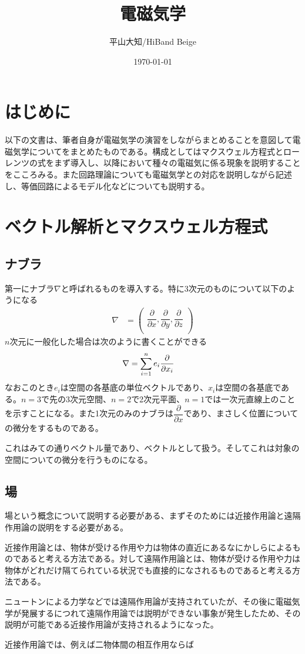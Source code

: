 \documentclass[titlepage,fontsize=10.5 pt]{jlreq}
\begin{document}
\title{電磁気学}
\author{平山大知/HiBand Beige}
\date{\today}
\maketitle
\tableofcontents
\clearpage
\section{はじめに}
以下の文書は、筆者自身が電磁気学の演習をしながらまとめることを意図して電磁気学についてをまとめたものである。構成としてはマクスウェル方程式とローレンツの式をまず導入し、以降において種々の電磁気に係る現象を説明することをこころみる。また回路理論についても電磁気学との対応を説明しながら記述し、等価回路によるモデル化などについても説明する。
\section{ベクトル解析とマクスウェル方程式}
\subsection{ナブラ}
第一にナブラ$\nabla$と呼ばれるものを導入する。特に3次元のものについて以下のようになる
\begin{align}
    \nabla &= \begin{pmatrix}
        \dfrac{\partial}{\partial x} , \dfrac{\partial}{\partial y} , \dfrac{\partial }{\partial z} \\
    \end{pmatrix}\label{eq.nabla}
\end{align}
$n$次元に一般化した場合は次のように書くことができる
\begin{align}
    \nabla &= \sum_{i=1}^{n} e_{i} \pdv{}{x_{i}}
\end{align}
なおこのとき$e_{i}$は空間の各基底の単位ベクトルであり、$x_{i}$は空間の各基底である。$n=3$で先の3次元空間、$n=2$で2次元平面、$n=1$では一次元直線上のことを示すことになる。また1次元のみのナブラは$\dfrac{\partial}{\partial x}$であり、まさしく位置についての微分をするものである。

これはみての通りベクトル量であり、ベクトルとして扱う。そしてこれは対象の空間についての微分を行うものになる。
\subsection{場}
場という概念について説明する必要がある、まずそのためには近接作用論と遠隔作用論の説明をする必要がある。

近接作用論とは、物体が受ける作用や力は物体の直近にあるなにかしらによるものであると考える方法である。対して遠隔作用論とは、物体が受ける作用や力は物体がどれだけ隔てられている状況でも直接的になされるものであると考える方法である。

ニュートンによる力学などでは遠隔作用論が支持されていたが、その後に電磁気学が発展するにつれて遠隔作用論では説明ができない事象が発生したため、その説明が可能である近接作用論が支持されるようになった。

近接作用論では、例えば二物体間の相互作用ならば
\end{document}
